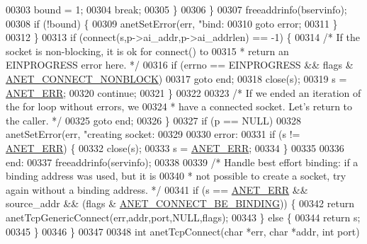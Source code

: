 \begin{DoxyCode}
{{{{{{{{{{{{{{{{00303                     bound = 1;
00304                     \textcolor{keywordflow}{break};
00305                 \}
00306             \}
00307             freeaddrinfo(bservinfo);
00308             \textcolor{keywordflow}{if} (!bound) \{
00309                 anetSetError(err, \textcolor{stringliteral}{"bind: %
00310                 \textcolor{keywordflow}{goto} error;
00311             \}
00312         \}
00313         \textcolor{keywordflow}{if} (connect(s,p->ai\_addr,p->ai\_addrlen) == -1) \{
00314             \textcolor{comment}{/* If the socket is non-blocking, it is ok for connect() to}
00315 \textcolor{comment}{             * return an EINPROGRESS error here. */}
00316             \textcolor{keywordflow}{if} (errno == EINPROGRESS && flags & \hyperlink{anet_8c_a487909d18aa88f156b4ef393bc9ceaed}{ANET\_CONNECT\_NONBLOCK})
00317                 \textcolor{keywordflow}{goto} end;
00318             close(s);
00319             s = \hyperlink{anet_8h_a0697b7774a7e0f4ef141839fe93536fe}{ANET\_ERR};
00320             \textcolor{keywordflow}{continue};
00321         \}
00322 
00323         \textcolor{comment}{/* If we ended an iteration of the for loop without errors, we}
00324 \textcolor{comment}{         * have a connected socket. Let's return to the caller. */}
00325         \textcolor{keywordflow}{goto} end;
00326     \}
00327     \textcolor{keywordflow}{if} (p == NULL)
00328         anetSetError(err, \textcolor{stringliteral}{"creating socket: %
00329 
00330 error:
00331     \textcolor{keywordflow}{if} (s != \hyperlink{anet_8h_a0697b7774a7e0f4ef141839fe93536fe}{ANET\_ERR}) \{
00332         close(s);
00333         s = \hyperlink{anet_8h_a0697b7774a7e0f4ef141839fe93536fe}{ANET\_ERR};
00334     \}
00335 
00336 end:
00337     freeaddrinfo(servinfo);
00338 
00339     \textcolor{comment}{/* Handle best effort binding: if a binding address was used, but it is}
00340 \textcolor{comment}{     * not possible to create a socket, try again without a binding address. */}
00341     \textcolor{keywordflow}{if} (s == \hyperlink{anet_8h_a0697b7774a7e0f4ef141839fe93536fe}{ANET\_ERR} && source\_addr && (flags & 
      \hyperlink{anet_8c_ad7a12e96a6a3deac27f3fb90db759d8b}{ANET\_CONNECT\_BE\_BINDING})) \{
00342         \textcolor{keywordflow}{return} anetTcpGenericConnect(err,addr,port,NULL,flags);
00343     \} \textcolor{keywordflow}{else} \{
00344         \textcolor{keywordflow}{return} s;
00345     \}
00346 \}
00347 
00348 \textcolor{keywordtype}{int} anetTcpConnect(\textcolor{keywordtype}{char} *err, \textcolor{keywordtype}{char} *addr, \textcolor{keywordtype}{int} port)
}}}}}}}}}}}}}}}}}}
\end{DoxyCode}
